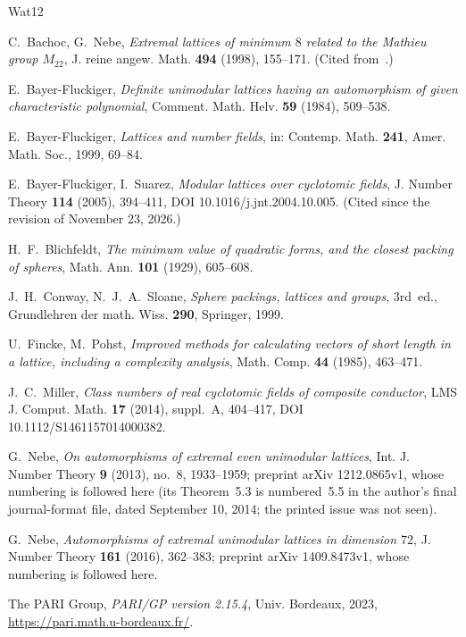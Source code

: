 \documentclass[11pt,a4paper]{amsart}
\theoremstyle{plain}
\theoremstyle{definition}
\numberwithin{equation}{section}
\begin{document}
\begin{thebibliography}{Wat12}

C.~Bachoc, G.~Nebe, \emph{Extremal lattices of minimum $8$ related to the Mathieu group $M_{22}$}, J. reine angew. Math. \textbf{494} (1998), 155--171. (Cited from~\cite{Sak26}.)

E.~Bayer-Fluckiger, \emph{Definite unimodular lattices having an automorphism of given characteristic polynomial}, Comment. Math. Helv. \textbf{59} (1984), 509--538.

E.~Bayer-Fluckiger, \emph{Lattices and number fields}, in: Contemp. Math. \textbf{241}, Amer. Math. Soc., 1999, 69--84.

E.~Bayer-Fluckiger, I.~Suarez, \emph{Modular lattices over cyclotomic fields}, J. Number Theory \textbf{114} (2005), 394--411, DOI 10.1016/j.jnt.2004.10.005. (Cited since the revision of November 23, 2026.)

H.~F.~Blichfeldt, \emph{The minimum value of quadratic forms, and the closest packing of spheres}, Math. Ann. \textbf{101} (1929), 605--608.

J.~H.~Conway, N.~J.~A.~Sloane, \emph{Sphere packings, lattices and groups}, 3rd~ed., Grundlehren der math. Wiss. \textbf{290}, Springer, 1999.

U.~Fincke, M.~Pohst, \emph{Improved methods for calculating vectors of short length in a lattice, including a complexity analysis}, Math. Comp. \textbf{44} (1985), 463--471.

J.~C.~Miller, \emph{Class numbers of real cyclotomic fields of composite conductor}, LMS J. Comput. Math. \textbf{17} (2014), suppl.~A, 404--417, DOI 10.1112/S1461157014000382.

G.~Nebe, \emph{On automorphisms of extremal even unimodular lattices}, Int. J. Number Theory \textbf{9} (2013), no.~8, 1933--1959; preprint arXiv 1212.0865v1, whose numbering is followed here (its Theorem~5.3 is numbered~5.5 in the author's final journal-format file, dated September 10, 2014; the printed issue was not seen).

G.~Nebe, \emph{Automorphisms of extremal unimodular lattices in dimension $72$}, J. Number Theory \textbf{161} (2016), 362--383; preprint arXiv 1409.8473v1, whose numbering is followed here.

The PARI Group, \emph{PARI/GP version 2.15.4}, Univ. Bordeaux, 2023, \url{https://pari.math.u-bordeaux.fr/}.


\end{thebibliography}
\end{document}
